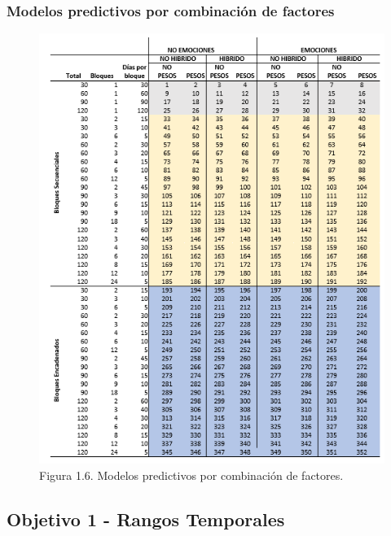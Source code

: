 \documentclass{beamer}
\begin{document}
\begin{frame}
	\frametitle{Modelos predictivos por combinación de factores}
	
	\begin{figure}[H]
		\centering
		\includegraphics[width=0.5\linewidth]{figs/imagen32}
		\caption{Figura 1.6. Modelos predictivos por combinación de factores.}
		\label{fig:imagen32}
	\end{figure}
\end{frame}


\subsection{ Objetivo 1 - Rangos Temporales}
\end{document}
